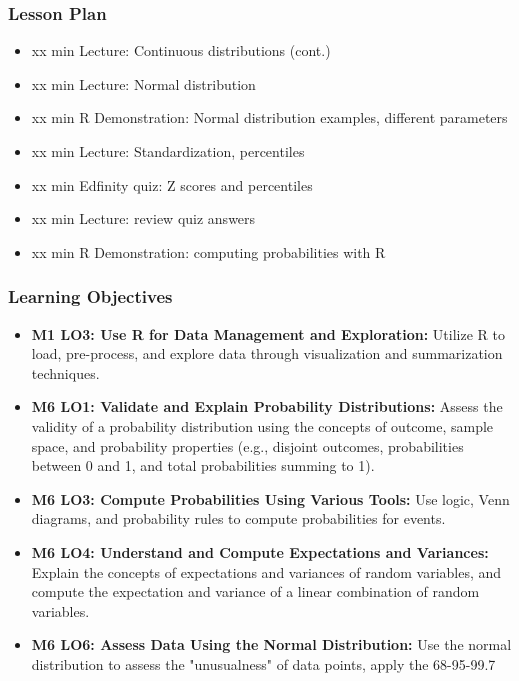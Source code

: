 \begin{frame}
    \frametitle{Lesson Plan}
    \begin{itemize}
        \item xx min Lecture: Continuous distributions (cont.)
        \item xx min Lecture: Normal distribution
        \item xx min R Demonstration: Normal distribution examples, different parameters
        \item xx min Lecture: Standardization, percentiles
        \item xx min Edfinity quiz: Z scores and percentiles
        \item xx min Lecture: review quiz answers
        \item xx min R Demonstration: computing probabilities with R
    \end{itemize}
    \end{frame}
    
    \begin{frame}
    \frametitle{Learning Objectives}
    \begin{itemize}
        \item \textbf{M1 LO3: Use R for Data Management and Exploration:} Utilize R to load, pre-process, and explore data through visualization and summarization techniques.
        \item \textbf{M6 LO1: Validate and Explain Probability Distributions:} Assess the validity of a probability distribution using the concepts of outcome, sample space, and probability properties (e.g., disjoint outcomes, probabilities between 0 and 1, and total probabilities summing to 1).
        \item \textbf{M6 LO3: Compute Probabilities Using Various Tools:} Use logic, Venn diagrams, and probability rules to compute probabilities for events.
        \item \textbf{M6 LO4: Understand and Compute Expectations and Variances:} Explain the concepts of expectations and variances of random variables, and compute the expectation and variance of a linear combination of random variables.
        \item \textbf{M6 LO6: Assess Data Using the Normal Distribution:} Use the normal distribution to assess the "unusualness" of data points, apply the 68-95-99.7%
    \end{itemize}
    \end{frame}
